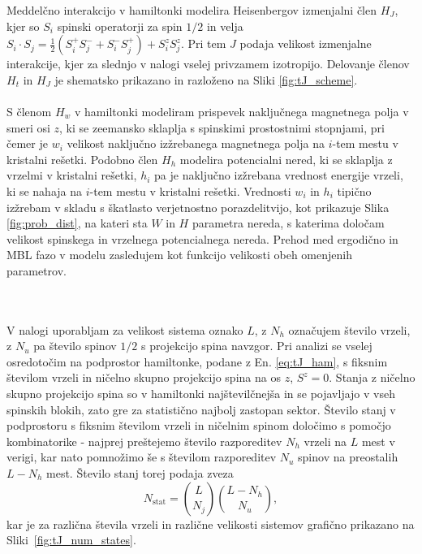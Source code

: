 \documentclass[10pt,a4paper]{article}
\begin{document}
Meddelčno interakcijo v hamiltonki modelira Heisenbergov izmenjalni člen $H_J$, kjer so $S_i$ spinski operatorji za spin $1/2$ in velja $S_i\cdot S_{j}=\frac{1}{2}\left(S_i^+S_j^- + S_i^-S_j^+\right) + S_i^zS_j^z$. Pri tem $J$ podaja velikost izmenjalne interakcije, kjer za slednjo v nalogi vselej privzamem izotropijo. Delovanje členov $H_t$ in $H_J$ je shematsko prikazano in razloženo na Sliki \ref{fig:tJ_scheme}. \\\\
S členom $H_w$ v hamiltonki modeliram prispevek naključnega magnetnega polja v smeri osi $z$, ki se zeemansko sklaplja s 
spinskimi prostostnimi stopnjami, pri čemer je $w_i$ velikost naključno izžrebanega magnetnega polja na $i$-tem mestu v kristalni rešetki. Podobno člen $H_h$ modelira potencialni nered, ki se sklaplja z vrzelmi v kristalni rešetki, $h_i$ pa je naključno izžrebana vrednost energije vrzeli, ki se nahaja na $i$-tem mestu v kristalni rešetki. Vrednosti $w_i$ in $h_i$ tipično izžrebam v skladu s škatlasto verjetnostno porazdelitvijo, kot prikazuje Slika \ref{fig:prob_dist}, na kateri sta $W$ in $H$	 parametra 
nereda, s katerima določam velikost spinskega in vrzelnega potencialnega nereda. Prehod med ergodično in MBL fazo
v modelu zasledujem kot funkcijo velikosti obeh omenjenih parametrov.
\begin{minipage}[t]{0.35\textwidth}
\noindent
 \\\\ 
 V nalogi uporabljam za velikost sistema oznako $L$, z $N_h$ označujem število vrzeli, z $N_u$ pa število spinov $1/2$ s projekcijo spina navzgor. Pri analizi se vselej osredotočim na podprostor hamiltonke, podane z En. \eqref{eq:tJ_ham}, s fiksnim številom vrzeli in ničelno skupno projekcijo spina na os $z$, $S^z=0$. Stanja z ničelno skupno projekcijo spina so v hamiltonki najštevilčnejša in se pojavljajo v vseh spinskih blokih, zato gre za statistično najbolj zastopan sektor. Število stanj v podprostoru s fiksnim številom vrzeli in ničelnim spinom določimo s pomočjo kombinatorike - najprej prešteje{}mo število razporeditev $N_h$ vrzeli na $L$ mest v verigi, kar nato pomnožimo še s številom razporeditev $N_u$ spinov na preostalih $L-N_h$ mest. Število stanj torej podaja zveza
\begin{equation}\label{eq:nstat}
N_\mathrm{stat}=\binom{L}{N_j}\binom{L-N_h}{N_u},
\end{equation}
kar je za različna števila vrzeli in različne velikosti sistemov grafično prikazano na Sliki~\ref{fig:tJ_num_states}.
\end{minipage}\hfill
\end{document}
